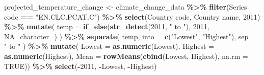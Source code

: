 \documentclass[
]{book}
\newenvironment{Shaded}{\begin{snugshade}}{\end{snugshade}}
\newcommand{\AttributeTok}[1]{\textcolor[rgb]{0.13,0.29,0.53}{#1}}
\newcommand{\ConstantTok}[1]{\textcolor[rgb]{0.56,0.35,0.01}{#1}}
\newcommand{\FunctionTok}[1]{\textcolor[rgb]{0.13,0.29,0.53}{\textbf{#1}}}
\newcommand{\NormalTok}[1]{#1}
\newcommand{\OtherTok}[1]{\textcolor[rgb]{0.56,0.35,0.01}{#1}}
\newcommand{\SpecialCharTok}[1]{\textcolor[rgb]{0.81,0.36,0.00}{\textbf{#1}}}
\newcommand{\StringTok}[1]{\textcolor[rgb]{0.31,0.60,0.02}{#1}}
\begin{document}
\begin{Shaded}
\begin{Highlighting}[]
\NormalTok{projected\_temperature\_change }\OtherTok{\textless{}{-}}\NormalTok{ climate\_change\_data }\SpecialCharTok{\%\textgreater{}\%} 
  \FunctionTok{filter}\NormalTok{(}\StringTok{\textasciigrave{}}\AttributeTok{Series code}\StringTok{\textasciigrave{}} \SpecialCharTok{==} \StringTok{"EN.CLC.PCAT.C"}\NormalTok{) }\SpecialCharTok{\%\textgreater{}\%} 
  \FunctionTok{select}\NormalTok{(}\StringTok{\textasciigrave{}}\AttributeTok{Country code}\StringTok{\textasciigrave{}}\NormalTok{, }\StringTok{\textasciigrave{}}\AttributeTok{Country name}\StringTok{\textasciigrave{}}\NormalTok{, }\StringTok{\textasciigrave{}}\AttributeTok{2011}\StringTok{\textasciigrave{}}\NormalTok{) }\SpecialCharTok{\%\textgreater{}\%} 
  \FunctionTok{mutate}\NormalTok{(}
    \AttributeTok{temp =} \FunctionTok{if\_else}\NormalTok{(}\FunctionTok{str\_detect}\NormalTok{(}\StringTok{\textasciigrave{}}\AttributeTok{2011}\StringTok{\textasciigrave{}}\NormalTok{, }\StringTok{" to "}\NormalTok{),}
                   \StringTok{\textasciigrave{}}\AttributeTok{2011}\StringTok{\textasciigrave{}}\NormalTok{,}
                   \ConstantTok{NA\_character\_}\NormalTok{)}
\NormalTok{  ) }\SpecialCharTok{\%\textgreater{}\%}
  \FunctionTok{separate}\NormalTok{(}
\NormalTok{    temp,}
    \AttributeTok{into =} \FunctionTok{c}\NormalTok{(}\StringTok{"Lowest"}\NormalTok{, }\StringTok{"Highest"}\NormalTok{),}
    \AttributeTok{sep =} \StringTok{" to "}
\NormalTok{  ) }\SpecialCharTok{\%\textgreater{}\%} 
  \FunctionTok{mutate}\NormalTok{(}
    \AttributeTok{Lowest =} \FunctionTok{as.numeric}\NormalTok{(Lowest),}
    \AttributeTok{Highest   =} \FunctionTok{as.numeric}\NormalTok{(Highest),}
    \AttributeTok{Mean    =} \FunctionTok{rowMeans}\NormalTok{(}\FunctionTok{cbind}\NormalTok{(Lowest, Highest), }\AttributeTok{na.rm =} \ConstantTok{TRUE}\NormalTok{)) }\SpecialCharTok{\%\textgreater{}\%}  
  \FunctionTok{select}\NormalTok{(}\SpecialCharTok{{-}}\StringTok{\textasciigrave{}}\AttributeTok{2011}\StringTok{\textasciigrave{}}\NormalTok{, }\SpecialCharTok{{-}}\NormalTok{Lowest, }\SpecialCharTok{{-}}\NormalTok{Highest)}


\end{Highlighting}
\end{Shaded}
\end{document}
